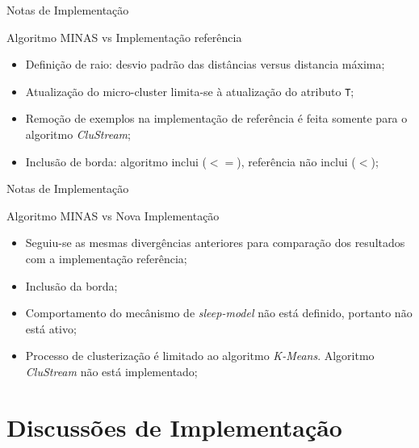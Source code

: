 \documentclass[aspectratio=43,10pt]{beamer}
\begin{document}

\begin{frame}[fragile]{Notas de Implementação}
  \begin{alertblock}{Algoritmo MINAS vs Implementação referência}
    \begin{itemize}%
      \item Definição de raio: desvio padrão das distâncias versus distancia máxima;
      \item Atualização do micro-cluster limita-se à atualização do atributo \texttt{T};
      \item Remoção de exemplos na implementação de referência é feita somente para o algoritmo \textit{CluStream};
      \item Inclusão de borda: algoritmo inclui ($<=$), referência não inclui ($<$);
    \end{itemize}
  \end{alertblock}
\end{frame}
\begin{frame}[fragile]{Notas de Implementação}
  \begin{alertblock}{Algoritmo MINAS vs Nova Implementação}
    \begin{itemize}
      \item Seguiu-se as mesmas divergências anteriores para comparação dos resultados com a implementação referência;
      \item Inclusão da borda;
      \item Comportamento do mecânismo de \textit{sleep-model} não está definido, portanto não está ativo;
      \item Processo de clusterização é limitado ao algoritmo \textit{K-Means}. Algoritmo \textit{CluStream} não está implementado;
    \end{itemize}
  \end{alertblock}
\end{frame}

\section{Discussões de Implementação}
\end{document}

